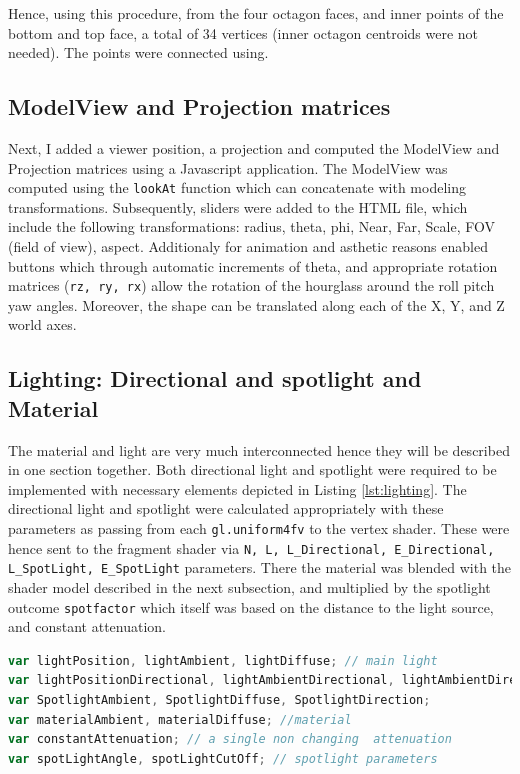 \documentclass[12pt,a4paper]{article}
\begin{document}
Hence, using this procedure, from the four octagon faces, and inner points of the bottom and top face, a total of 34 vertices  (inner octagon centroids were not needed). The points were connected using.

\subsection{ModelView and Projection matrices}

Next, I added a viewer position, a projection and computed the ModelView and Projection matrices using a Javascript application. The ModelView was computed using the \texttt{lookAt} function which can concatenate with modeling transformations. Subsequently, sliders were added to the HTML file, which include the following transformations: radius, theta, phi, Near, Far, Scale, FOV (field of view), aspect. Additionaly for animation and asthetic reasons enabled buttons which through automatic increments of theta, and appropriate rotation matrices (\texttt{rz, ry, rx}) allow the rotation of the hourglass around the roll pitch yaw angles. Moreover, the shape can be translated along each of the X, Y, and Z world axes.

\subsection{Lighting: Directional and spotlight and Material}
The material and light are very much interconnected hence they will be described in one section together.
Both directional light and spotlight were required to be implemented with necessary elements depicted in Listing \ref{lst:lighting}. The directional light and spotlight were calculated appropriately  with these parameters as passing from each \texttt{gl.uniform4fv}  to the vertex shader. These were hence sent to the fragment shader via \texttt{N, L, L\_Directional, E\_Directional, L\_SpotLight, E\_SpotLight} parameters. There the material was blended with the shader model described in the next subsection, and multiplied by the spotlight outcome \texttt{spotfactor} which itself was based on the distance to the light source, and constant attenuation.

\begin{lstlisting}[caption={Light and Material parameters},label={lst:lighting},language=JavaScript]
var lightPosition, lightAmbient, lightDiffuse; // main light
var lightPositionDirectional, lightAmbientDirectional, lightAmbientDirectional;
var SpotlightAmbient, SpotlightDiffuse, SpotlightDirection;
var materialAmbient, materialDiffuse; //material
var constantAttenuation; // a single non changing  attenuation
var spotLightAngle, spotLightCutOff; // spotlight parameters
\end{lstlisting}
\end{document}
